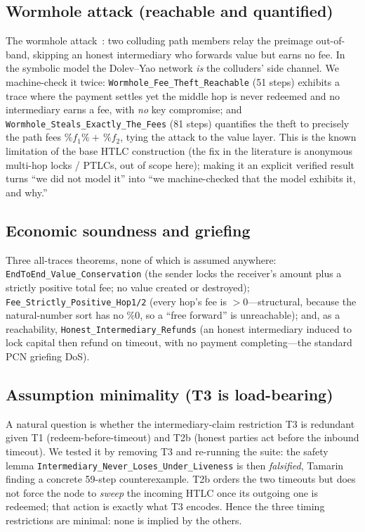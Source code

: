 \documentclass[11pt]{article}
\begin{document}
\subsection{Wormhole attack (reachable and quantified)}

The wormhole attack~\cite{malavolta}: two colluding path members
relay the preimage out-of-band, skipping an honest intermediary who forwards
value but earns no fee. In the symbolic model the Dolev--Yao network \emph{is}
the colluders' side channel. We machine-check it twice:
\texttt{Wormhole_Fee_Theft_Reachable} (51 steps) exhibits a trace where the
payment settles yet the middle hop is never redeemed and no intermediary earns
a fee, with \emph{no} key compromise; and
\texttt{Wormhole_Steals_Exactly_The_Fees} (81 steps) quantifies the theft to
precisely the path fees $\%f_1 \%{+}\, \%f_2$, tying the attack to the value
layer. This is the known limitation of the base HTLC construction (the fix in
the literature is anonymous multi-hop locks / PTLCs, out of scope here); making
it an explicit verified result turns ``we did not model it'' into ``we
machine-checked that the model exhibits it, and why.''

\subsection{Economic soundness and griefing}

Three all-traces theorems, none of which is assumed anywhere:
\texttt{EndToEnd_Value_Conservation} (the sender locks the receiver's amount
plus a strictly positive total fee; no value created or destroyed);
\texttt{Fee_Strictly_Positive_Hop1/2} (every hop's fee is $>0$---structural,
because the natural-number sort has no $\%0$, so a ``free forward'' is
unreachable); and, as a reachability, \texttt{Honest_Intermediary_Refunds}
(an honest intermediary induced to lock capital then refund on timeout, with no
payment completing---the standard PCN griefing DoS).

\subsection{Assumption minimality (T3 is load-bearing)}
\label{sec:t3}

A natural question is whether the intermediary-claim restriction T3 is redundant
given T1 (redeem-before-timeout) and T2b (honest parties act before the inbound
timeout). We tested it by removing T3 and re-running the suite: the safety lemma
\texttt{Intermediary_Never_Loses_Under_Liveness} is then \emph{falsified},
Tamarin finding a concrete 59-step counterexample. T2b orders the two timeouts
but does not force the node to \emph{sweep} the incoming HTLC once its outgoing
one is redeemed; that action is exactly what T3 encodes. Hence the three timing
restrictions are minimal: none is implied by the others.
\end{document}
